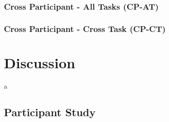 \documentclass[11pt]{article}
\begin{document}
		\subsubsection{Cross Participant - All Tasks (CP-AT)}
		\begin{figure}
		\centering
		\caption{}
		\label{fig:cp-at}
		\end{figure} 
		
		\subsubsection{Cross Participant - Cross Task (CP-CT)}
		\begin{figure}
		\centering
		\caption{}
		\label{fig:cp-ct}
		\end{figure} 

		
\section{Discussion}
a


	\subsection{Participant Study}
	
	
	
		
	
\end{document}
